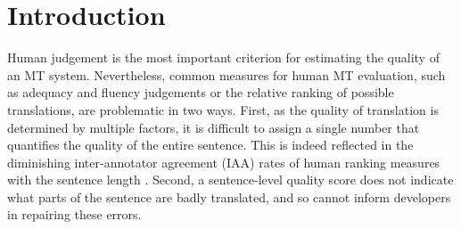 \documentclass[11pt]{article}
\begin{document}
\begin{abstract}

\end{abstract}


\section{Introduction}\label{sec:intro}

Human judgement is the most important criterion for
estimating the quality of an MT system.
Nevertheless, common measures for human MT evaluation, such as adequacy and fluency judgements
or the relative ranking of possible translations, are problematic in two ways.
First, as the quality of translation is determined by multiple factors, it is difficult
to assign a single number that quantifies the quality of the entire sentence. This
is indeed reflected in the diminishing inter-annotator agreement (IAA) rates of human ranking measures
with
the sentence length \cite{Bojar:2011}.
Second, a sentence-level quality score does not indicate what parts of the sentence
are badly translated, and so cannot inform developers in repairing these errors.
\end{document}
